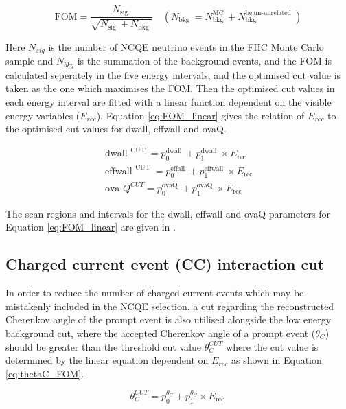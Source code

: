 \begin{equation}
    \mathrm{FOM}=\frac{N_{\text {sig }}}{\sqrt{N_{\text {sig }}+N_{\text {bkg }}}} \quad\left(N_{\text {bkg }}=N_{\text {bkg }}^{\mathrm{MC}}+N_{\text {bkg }}^{\text {beam-unrelated }}\right)
\label{eq:FOM}
\end{equation}

Here $N_{sig}$ is the number of NCQE neutrino events in the FHC Monte Carlo sample and $N_{bkg}$ is the summation of the background events, and the FOM is calculated seperately in the five energy intervals, and the optimised cut value is taken as the one which maximises the FOM. Then the optimised cut values in each energy interval are fitted with a linear function dependent on the visible energy variables ($E_{rec}$). Equation \ref{eq:FOM_linear} gives the relation of $E_{rec}$ to the optimised cut values for dwall, effwall and ovaQ.

\begin{align}
    \text { dwall }^{\text {CUT }} =p_{0}^{\text {dwall }}+p_{1}^{\text {dwall }} \times E_{\text {rec }} \\
    \text { effwall }^{\text {CUT }}=p_{0}^{\text {effall }}+p_{1}^{\text {effwall }} \times E_{\text {rec }} \\
    \text { ova } Q^{C U T}=p_{0}^{\text {ovaQ }}+p_{1}^{\text {ovaQ }} \times E_{\text {rec }}
\label{eq:FOM_linear}
\end{align}


The scan regions and intervals for the dwall, effwall and ovaQ parameters for Equation \ref{eq:FOM_linear} are given in \cite{Abe_2019}. 

\subsection{Charged current event (CC) interaction cut}

In order to reduce the number of charged-current events which may be mistakenly included in the NCQE selection, a cut regarding the reconstructed Cherenkov angle of the prompt event  is also utilised alongside the low energy background cut, where the accepted Cherenkov angle of a prompt event ($\theta_{C}$) should be greater than the threshold cut value $\theta_{C}^{CUT}$ where the cut value is determined by the linear equation dependent on $E_{rec}$ as shown in Equation \ref{eq:thetaC_FOM}.

\begin{equation}
    \theta_{C}^{C U T}=p_{0}^{\theta_{C}}+p_{1}^{\theta_{C}} \times E_{\text {rec }}
    \label{eq:thetaC_FOM} 
\end{equation}

